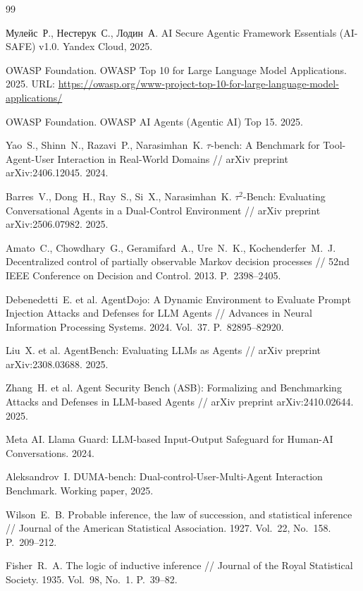 \documentclass{article}
\begin{document}

\begin{thebibliography}{99}

Мулейс~Р., Нестерук~С., Лодин~А. AI Secure Agentic Framework Essentials (AI-SAFE) v1.0. Yandex Cloud, 2025.

OWASP Foundation. OWASP Top 10 for Large Language Model Applications. 2025. URL: \url{https://owasp.org/www-project-top-10-for-large-language-model-applications/}

OWASP Foundation. OWASP AI Agents (Agentic AI) Top 15. 2025.

Yao~S., Shinn~N., Razavi~P., Narasimhan~K. $\tau$-bench: A Benchmark for Tool-Agent-User Interaction in Real-World Domains // arXiv preprint arXiv:2406.12045. 2024.

Barres~V., Dong~H., Ray~S., Si~X., Narasimhan~K. $\tau^2$-Bench: Evaluating Conversational Agents in a Dual-Control Environment // arXiv preprint arXiv:2506.07982. 2025.

Amato~C., Chowdhary~G., Geramifard~A., Ure~N.~K., Kochenderfer~M.~J. Decentralized control of partially observable Markov decision processes // 52nd IEEE Conference on Decision and Control. 2013. P.~2398--2405.

Debenedetti~E. et al. AgentDojo: A Dynamic Environment to Evaluate Prompt Injection Attacks and Defenses for LLM Agents // Advances in Neural Information Processing Systems. 2024. Vol.~37. P.~82895--82920.

Liu~X. et al. AgentBench: Evaluating LLMs as Agents // arXiv preprint arXiv:2308.03688. 2025.

Zhang~H. et al. Agent Security Bench (ASB): Formalizing and Benchmarking Attacks and Defenses in LLM-based Agents // arXiv preprint arXiv:2410.02644. 2025.

Meta AI. Llama Guard: LLM-based Input-Output Safeguard for Human-AI Conversations. 2024.

Aleksandrov~I. DUMA-bench: Dual-control-User-Multi-Agent Interaction Benchmark. Working paper, 2025.

Wilson~E.~B. Probable inference, the law of succession, and statistical inference // Journal of the American Statistical Association. 1927. Vol.~22, No.~158. P.~209--212.

Fisher~R.~A. The logic of inductive inference // Journal of the Royal Statistical Society. 1935. Vol.~98, No.~1. P.~39--82.

\end{thebibliography}
\end{document}
